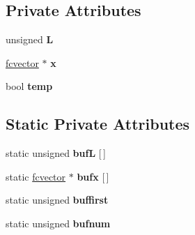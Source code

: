 \subsection*{Private Attributes}
\begin{DoxyCompactItemize}
\item 
unsigned {\bfseries L}\hypertarget{classvcmatrix_a4a0a89cb5ecce1ef0ba52fde1b1e546a}{}\label{classvcmatrix_a4a0a89cb5ecce1ef0ba52fde1b1e546a}

\item 
\hyperlink{classfcvector}{fcvector} $\ast$ {\bfseries x}\hypertarget{classvcmatrix_a8ce412fb8022e8b98764189d82e0b5a6}{}\label{classvcmatrix_a8ce412fb8022e8b98764189d82e0b5a6}

\item 
bool {\bfseries temp}\hypertarget{classvcmatrix_a514688ad1f073f2e438d33f0815b5374}{}\label{classvcmatrix_a514688ad1f073f2e438d33f0815b5374}

\end{DoxyCompactItemize}
\subsection*{Static Private Attributes}
\begin{DoxyCompactItemize}
\item 
static unsigned {\bfseries bufL} \mbox{[}$\,$\mbox{]}\hypertarget{classvcmatrix_ad5601fe520082719a7126639bc038279}{}\label{classvcmatrix_ad5601fe520082719a7126639bc038279}

\item 
static \hyperlink{classfcvector}{fcvector} $\ast$ {\bfseries bufx} \mbox{[}$\,$\mbox{]}\hypertarget{classvcmatrix_a30bf671a73e80416d16e40b2d451e4f8}{}\label{classvcmatrix_a30bf671a73e80416d16e40b2d451e4f8}

\item 
static unsigned {\bfseries buffirst}\hypertarget{classvcmatrix_a2d276b94731aa8772e0707a864db4650}{}\label{classvcmatrix_a2d276b94731aa8772e0707a864db4650}

\item 
static unsigned {\bfseries bufnum}\hypertarget{classvcmatrix_ad26c6e91bef2ea6206d19df3429a6e10}{}\label{classvcmatrix_ad26c6e91bef2ea6206d19df3429a6e10}

\end{DoxyCompactItemize}
